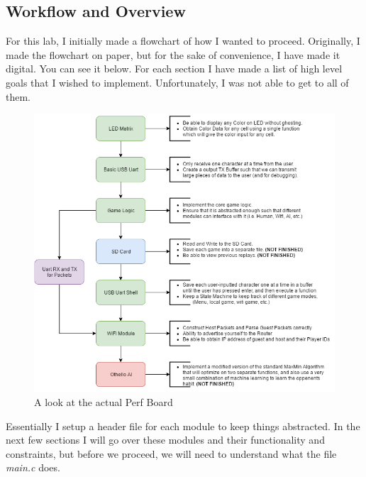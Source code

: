 \documentclass[a4paper, 12pt]{article}
\begin{document}
    \subsection{Workflow and Overview}

    For this lab, I initially made a flowchart of how I wanted to proceed.
    Originally, I made the flowchart on paper, but for the sake of
    convenience, I have made it digital. You can see it below. For each
    section I have made a list of high level goals that I wished to
    implement. Unfortunately, I was not able to get to all of them. 

    \begin{figure}[H]
        \centering
        \includegraphics[scale=0.7]{pics/othelloFlow}
        \caption{A look at the actual Perf Board}
        \label{fig:PerfSetup}
    \end{figure}

    Essentially I setup a header file for each module to keep things
    abstracted. In the next few sections I will go over these modules and
    their functionality and constraints, but before we proceed, we will need
    to understand what the file \textit{main.c} does.
\end{document}

